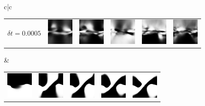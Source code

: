 \begin{figure}[!ht]
\begin{tabular}{c|c}
\begin{tabular}{l|lllll}
			$\delta t = 0.0005$ &\includegraphics[width=\iw]{figs_data/pendulum/0.0005/ddpg_act_40.png} &\includegraphics[width=\iw]{figs_data/pendulum/0.0005/ddpg_act_80.png} &\includegraphics[width=\iw]{figs_data/pendulum/0.0005/ddpg_act_120.png} &\includegraphics[width=\iw]{figs_data/pendulum/0.0005/ddpg_act_160.png} &\includegraphics[width=\iw]{figs_data/pendulum/0.0005/ddpg_act_200.png}
		\end{tabular} &
		\begin{tabular}{lllll}
			 \includegraphics[width=\iw]{figs_data/pendulum/0.01/au_act_2.png} &\includegraphics[width=\iw]{figs_data/pendulum/0.01/au_act_4.png} &\includegraphics[width=\iw]{figs_data/pendulum/0.01/au_act_6.png} &\includegraphics[width=\iw]{figs_data/pendulum/0.01/au_act_8.png} &\includegraphics[width=\iw]{figs_data/pendulum/0.01/au_act_10.png} \\

\end{tabular}
\end{tabular}
\end{figure}
